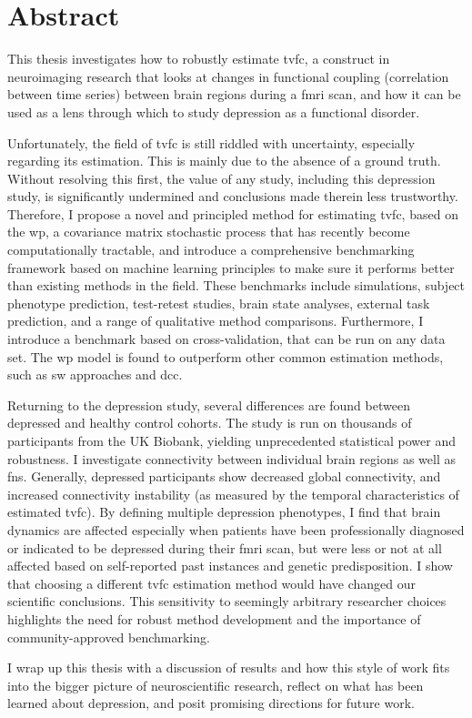 \chapter*{Abstract}

This thesis investigates how to robustly estimate \gls{tvfc}, a construct in neuroimaging research that looks at changes in functional coupling (correlation between time series) between brain regions during a \gls{fmri} scan, and how it can be used as a lens through which to study depression as a functional disorder.

Unfortunately, the field of \gls{tvfc} is still riddled with uncertainty, especially regarding its estimation.
This is mainly due to the absence of a ground truth.
Without resolving this first, the value of any study, including this depression study, is significantly undermined and conclusions made therein less trustworthy.
Therefore, I propose a novel and principled method for estimating \gls{tvfc}, based on the \gls{wp}, a covariance matrix stochastic process that has recently become computationally tractable, and introduce a comprehensive benchmarking framework based on machine learning principles to make sure it performs better than existing methods in the field.
These benchmarks include simulations, subject phenotype prediction, test-retest studies, brain state analyses, external task prediction, and a range of qualitative method comparisons.
Furthermore, I introduce a benchmark based on cross-validation, that can be run on any data set.
The \gls{wp} model is found to outperform other common estimation methods, such as \gls{sw} approaches and \gls{dcc}.

Returning to the depression study, several differences are found between depressed and healthy control cohorts.
The study is run on thousands of participants from the UK Biobank, yielding unprecedented statistical power and robustness.
I investigate connectivity between individual brain regions as well as \glspl{fn}.
Generally, depressed participants show decreased global connectivity, and increased connectivity instability (as measured by the temporal characteristics of estimated \gls{tvfc}).
By defining multiple depression phenotypes, I find that brain dynamics are affected especially when patients have been professionally diagnosed or indicated to be depressed during their \gls{fmri} scan, but were less or not at all affected based on self-reported past instances and genetic predisposition.
I show that choosing a different \gls{tvfc} estimation method would have changed our scientific conclusions.
This sensitivity to seemingly arbitrary researcher choices highlights the need for robust method development and the importance of community-approved benchmarking.

I wrap up this thesis with a discussion of results and how this style of work fits into the bigger picture of neuroscientific research, reflect on what has been learned about depression, and posit promising directions for future work.
